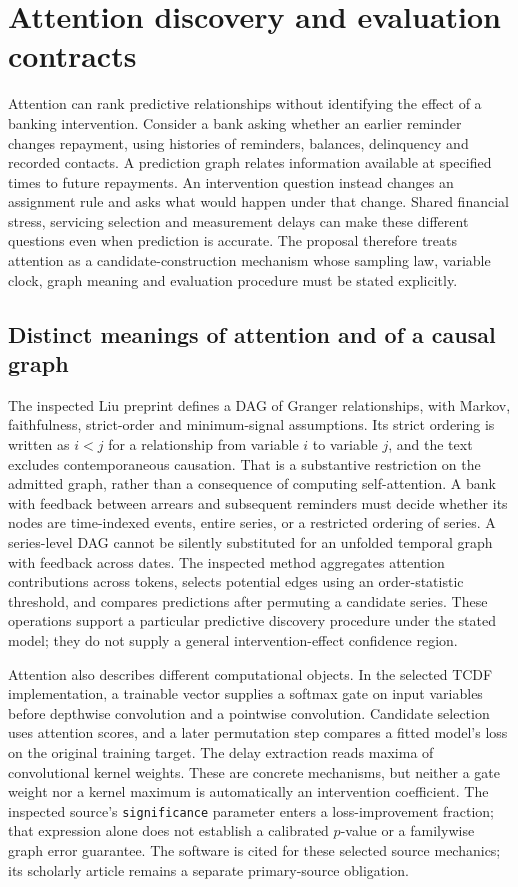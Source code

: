 \section[Attention discovery and evaluation contracts]{Attention discovery and evaluation contracts}
\label{sec:exec28-at}
Attention can rank predictive relationships without identifying the effect of a banking intervention.
Consider a bank asking whether an earlier reminder changes repayment, using histories of reminders,
balances, delinquency and recorded contacts. A prediction graph relates information available at
specified times to future repayments. An intervention question instead changes an assignment rule
and asks what would happen under that change. Shared financial stress, servicing selection and
measurement delays can make these different questions even when prediction is accurate. The
proposal therefore treats attention as a candidate-construction mechanism whose sampling law,
variable clock, graph meaning and evaluation procedure must be stated explicitly.

\subsection{Distinct meanings of attention and of a causal graph}
The inspected Liu preprint defines a DAG of Granger relationships, with Markov, faithfulness,
strict-order and minimum-signal assumptions. Its strict ordering is written as $i<j$ for a
relationship from variable $i$ to variable $j$, and the text excludes contemporaneous causation.
That is a substantive restriction on the admitted graph, rather than a consequence of computing
self-attention. A bank with feedback between arrears and subsequent reminders must decide whether
its nodes are time-indexed events, entire series, or a restricted ordering of series. A series-level
DAG cannot be silently substituted for an unfolded temporal graph with feedback across dates.
The inspected method aggregates attention contributions across tokens, selects potential edges
using an order-statistic threshold, and compares predictions after permuting a candidate series.
These operations support a particular predictive discovery procedure under the stated model;
they do not supply a general intervention-effect confidence region.\citep{exec28_at_liu}

Attention also describes different computational objects. In the selected TCDF implementation,
a trainable vector supplies a softmax gate on input variables before depthwise convolution and a
pointwise convolution. Candidate selection uses attention scores, and a later permutation step
compares a fitted model's loss on the original training target. The delay extraction reads maxima
of convolutional kernel weights. These are concrete mechanisms, but neither a gate weight nor a
kernel maximum is automatically an intervention coefficient. The inspected source's
\texttt{significance} parameter enters a loss-improvement fraction; that expression alone does
not establish a calibrated $p$-value or a familywise graph error guarantee. The software is cited
for these selected source mechanics; its scholarly article remains a separate primary-source
obligation.\citep{exec28_at_tcdf}

